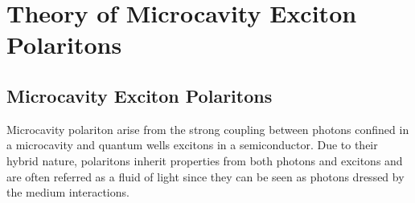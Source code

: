 
\newcommand{\kperp}{\mathbf{k}_\perp}
\newcommand{\rperp}{\mathbf{r}_\perp}
\newcommand{\kpar}{\mathbf{k}_\parallel}
\newcommand{\kparph}{\mathbf{k}_\parallel^\gamma}
\newcommand{\kparX}{\mathbf{k}_\parallel^X}
\newcommand{\Ehat}{\hat{\mathcal{E}}}
\newcommand{\dEhat}{\delta\hat{\mathcal{E}}}
\newcommand{\akdag}{\hat{a}_k^\dagger}
\newcommand{\ak}{\hat{a}_k}
\newcommand{\bkdag}{\hat{b}_k^\dagger}  
\newcommand{\bk}{\hat{b}_k}
\newcommand{\amk}{\hat{a}_{-\mathbf{k}_\perp}}
\newcommand{\amkdag}{\hat{a}^\dagger_{-\mathbf{k}_\perp}}

\newcommand{\hk}{\hat{h}_k}
\newcommand{\hkdag}{\hat{h}_k^\dagger}
\newcommand{\bmk}{\hat{b}_{-\mathbf{k}_\perp}}
\newcommand{\bmkdag}{\hat{b}^\dagger_{-\mathbf{k}_\perp}}
\newcommand{\Vintra}{\dfrac{4\pi e^2}{L^3q^2\epsilon_{sc}}}
\newcommand{\OmR}{\Omega_R}
\newcommand{\veck}{\mathbf{k}}
\newcommand{\ukdag}{u_{\mathbf{k}}^{\dagger}}
\newcommand{\uk}{u_{\mathbf{k}}}
\newcommand{\pkdag}{p_{\mathbf{k}}^{\dagger}}
\newcommand{\pk}{p_{\mathbf{k}}}
\newcommand{\kvec}{\mathbf{k}}
\newcommand{\DeltaEX}{\Delta E_{X-\gamma}}
\newcommand{\Eph}{E_{\gamma}}
\newcommand{\Eex}{E_{X}}
\newcommand{\rmi}{\mathrm{i}}
\newcommand{\rvec}{\mathbf{r}}
\newcommand{\psilp}{\psi_{LP}}
\newcommand{\gamlp}{\gamma_{LP}}
\newcommand{\omlp}{\omega_{LP}}
\newcommand{\mlp}{m_{LP}}
\newcommand{\omp}{\omega_p}
\newcommand{\gamr}{\gamma_r}
\newcommand{\gamin}{\gamma_{in}}
\newcommand{\gr}{g_r}
\newcommand{\kp}{k_p}
\newcommand{\nr}{n_r}
\newcommand{\gamc}{\gamma_c}

\graphicspath{{./}{./fig/}{./chap_theory/fig/}}




\part{Theory of Microcavity Exciton Polaritons}


\chapter{Microcavity Exciton Polaritons}\label{chap:polariton_theory}

Microcavity polariton arise from the strong coupling between photons confined in a microcavity and quantum wells excitons in a semiconductor. Due to their hybrid nature, polaritons inherit properties from both photons and excitons and are often referred as a fluid of light since they can be seen as photons dressed by the medium interactions.

